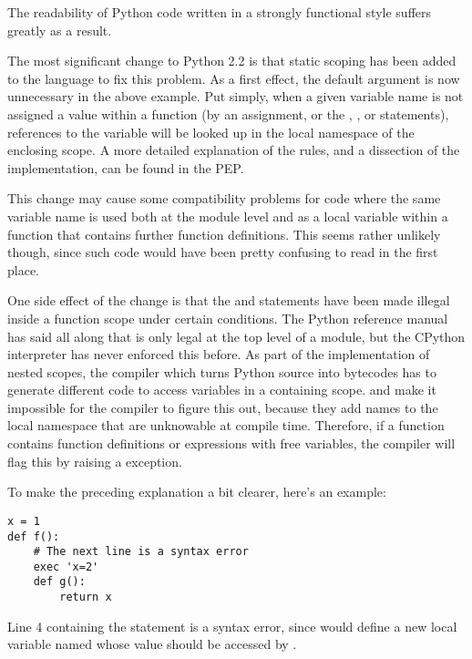 \documentclass{howto}
\begin{document}
The readability of Python code written in a strongly functional style
suffers greatly as a result.

The most significant change to Python 2.2 is that static scoping has
been added to the language to fix this problem.  As a first effect,
the  default argument is now unnecessary in the above
example.  Put simply, when a given variable name is not assigned a
value within a function (by an assignment, or the ,
, or  statements), references to the
variable will be looked up in the local namespace of the enclosing
scope.  A more detailed explanation of the rules, and a dissection of
the implementation, can be found in the PEP.

This change may cause some compatibility problems for code where the
same variable name is used both at the module level and as a local
variable within a function that contains further function definitions.
This seems rather unlikely though, since such code would have been
pretty confusing to read in the first place.  

One side effect of the change is that the  and  statements have been made illegal inside
a function scope under certain conditions.  The Python reference
manual has said all along that  is
only legal at the top level of a module, but the CPython interpreter
has never enforced this before.  As part of the implementation of
nested scopes, the compiler which turns Python source into bytecodes
has to generate different code to access variables in a containing
scope.   and  make it
impossible for the compiler to figure this out, because they add names
to the local namespace that are unknowable at compile time.
Therefore, if a function contains function definitions or
 expressions with free variables, the compiler will
flag this by raising a  exception.

To make the preceding explanation a bit clearer, here's an example:

\begin{verbatim}
x = 1
def f():
    # The next line is a syntax error
    exec 'x=2'  
    def g():
        return x
\end{verbatim}

Line 4 containing the  statement is a syntax error,
since  would define a new local variable named 
whose value should be accessed by .  
\end{document}
